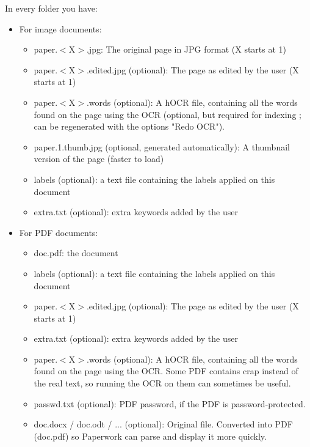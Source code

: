 \documentclass[10pt,a4paper]{article}
\begin{document}
In every folder you have:
\begin{itemize}
	\item For image documents:
	\begin{itemize}
		\item paper.$<$X$>$.jpg: The original page in JPG format (X starts at 1)
		\item paper.$<$X$>$.edited.jpg (optional): The page as edited by the user (X starts at 1)
		\item paper.$<$X$>$.words (optional): A hOCR file, containing all the words
		found on the page using the OCR (optional, but required for indexing
		; can be regenerated with the options "Redo OCR").
		\item paper.1.thumb.jpg (optional, generated automatically): A thumbnail
		version of the page (faster to load)
		\item labels (optional): a text file containing the labels applied on this document
		\item extra.txt (optional): extra keywords added by the user
	\end{itemize}

	\item For PDF documents:
	\begin{itemize}
		\item doc.pdf: the document
		\item labels (optional): a text file containing the labels applied on this document
		\item paper.$<$X$>$.edited.jpg (optional): The page as edited by the user (X starts at 1)
		\item extra.txt (optional): extra keywords added by the user
		\item paper.$<$X$>$.words (optional): A hOCR file, containing all the words
		found on the page using the OCR. Some PDF contains crap instead of
			the real text, so running the OCR on them can sometimes be useful.
		\item passwd.txt (optional): PDF password, if the PDF is
			password-protected.
		\item doc.docx / doc.odt / ... (optional): Original file.
			Converted into PDF (doc.pdf) so Paperwork can parse
			and display it more quickly.
	\end{itemize}
\end{itemize}
\end{document}
